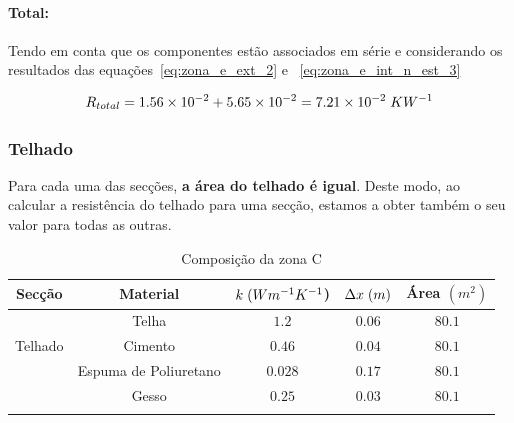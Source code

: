 \documentclass[12pt, a4paper]{article}
\begin{document}
\paragraph{Total:}\label{par:zona_e_total:} Tendo em conta que os componentes est\~ao
associados em série e considerando os resultados das
equa\c{c}\~oes~\ref{eq:zona_e_ext_2} e ~\ref{eq:zona_e_int_n_est_3}

\begin{equation}
	R_{total} =
			1.56 \times 10^{-2} + 5.65 \times 10^{-2} = 7.21 \times 10^{-2} \hspace{1mm} KW^{-1}
	\label{eq:zona_e_total}
\end{equation}



\subsubsection{Telhado}\label{ssub:Telhado}

Para cada uma das secções, \textbf{a área do telhado é igual}. Deste modo, ao calcular a resistência do telhado 
para uma secção, estamos a obter também o seu valor para todas as outras.
\begin{table}[htpb]
	\begin{center}
		\begin{tabular}{c c c c c}
			\toprule{}
			Secção                     & Material               & $ k \hspace{1mm} (Wm^{-1}K^{-1}$) & $ \Delta x \hspace{1mm} (m)$ & Área $(m^2) $ \\
				\midrule{}

			\multirow{5}{*}{}          & Telha                  & $1.2$                             & $0.06$                       & $80.1$        \\
				\cline{2-5}
			Telhado                    & Cimento				& $0.46$                            & $0.04$                       & $80.1$        \\
				\cline{2-5}
			                           & Espuma de Poliuretano  & $0.028$                           & $0.17$                       & $80.1$        \\
				\cline{2-5}
									   & Gesso				 	& $0.25$                            & $0.03$                       & $80.1$        \\
			\bottomrule{}
		\end{tabular}
	\end{center}
	\caption{Composição da zona C}\label{tab:telhado}
\end{table}
\end{document}
